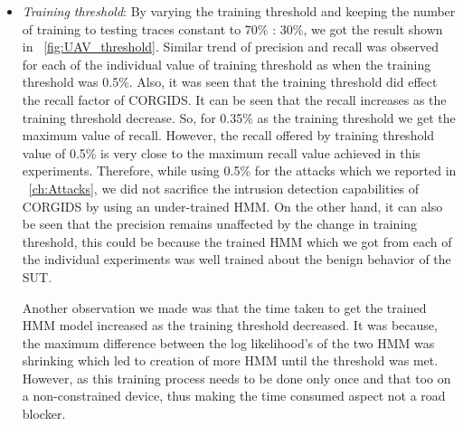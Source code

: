 \begin{itemize}

\item \textit{Training threshold}: By varying the training threshold and keeping the number of training to testing traces constant to 70\% : 30\%, we got the result shown in ~\autoref{fig:UAV_threshold}. Similar trend of precision and recall was observed for each of the individual value of training threshold as when the training threshold was 0.5\%. Also, it was seen that the training threshold did effect the recall factor of \ac{CORGIDS}. It can be seen that the recall increases as the training threshold decrease. So, for 0.35\% as the training threshold we get the maximum value of recall. However, the recall offered by training threshold value of 0.5\% is very close to the maximum recall value achieved in this experiments. Therefore, while using 0.5\% for the attacks which we reported in ~\autoref{ch:Attacks}, we did not sacrifice the intrusion detection capabilities of \ac{CORGIDS} by using an under-trained \ac{HMM}. On the other hand, it can also be seen that the precision remains unaffected by the change in training threshold, this could be because the trained \ac{HMM} which we got from each of the individual experiments was well trained about the benign behavior of the \ac{SUT}.

Another observation we made was that the time taken to get the trained \ac{HMM} model increased as the training threshold decreased. It was because, the maximum difference between the log likelihood's of the two \ac{HMM} was shrinking which led to creation of more \ac{HMM} until the threshold was met. However, as this training process needs to be done only once and that too on a non-constrained device, thus making the time consumed aspect not a road blocker.

\end{itemize}
